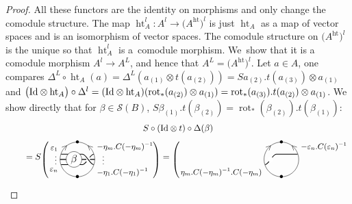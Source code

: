 \documentclass[pdftex]{sigma}%
\numberwithin{equation}{section}
\newcommand{\halft}{{\operatorname{ht}}}
\begin{document}
\begin{proof}
All these functors are the identity on morphisms and only change the comodule structure. The map $\halft_A^l\colon A^l \to \big(A^\halft\big)^l$ is just $\halft_A$ as a map of vector spaces and is an isomorphism of vector spaces. The comodule structure on $\big(A^\halft\big)^l$ is the unique so that $\halft_A^l$ is a~comodule morphism. We~show that it is a comodule morphism $A^l\to A^L$, and hence that $A^L = \big(A^\halft\big)^l$. Let $a \in A$, one compares $\Delta^L \circ \halft_A (a) = \Delta^L(a_{(1)} \otimes t(a_{(2)})) = Sa_{(2)}.t(a_{(3)}) \otimes a_{(1)}$ and $\big({\rm Id} \otimes \halft_A\big) \circ \Delta^l = ({\rm Id} \otimes \halft_A)(\operatorname{rot}_*(a_{(2)})\otimes a_{(1)}) = \operatorname{rot}_*(a_{(3)}).t(a_{(2)}) \otimes a_{(1)}$. We show directly that for $\beta \in \mathscr{S}(B)$, $S\beta_{(1)}.t(\beta_{(2)}) = \operatorname{rot}_*(\beta_{(2)}).t(\beta_{(1)})$:
\begin{gather*}
S \circ ({\rm Id} \otimes t) \circ \Delta (\beta)
\\ \qquad
{}=S\raisebox{-3pt}{$\left(\rule{0pt}{24pt}\right.$}\!\!
\begin{tikzpicture}[scale = 0.7, baseline = 0pt]
\draw (0,-1) node{\small $\bullet$} arc(-90:90:1) node[near end, sloped]{\small $<$} node{\small $\bullet$};
\draw (0,-1) arc(-90:-270:1) node[near end, sloped]{\small $>$};
\draw[thick] (-0.94,-0.3)node[below left]{\small $\varepsilon_n$} -- (0.3,-0.3) .. controls (0.5,-0.3) and (0.74,0.3).. (0.94,0.3)node[above right]{\small $-\eta_m.C(-\eta_m)^{-1}$} node[pos = 0.5, circle, fill = white, scale = 0.66]{};
\draw[thick] (-1,0) node[yshift=2pt, left]{\footnotesize $\vdots$} -- (1,0)node[yshift=2pt,right=5pt]{\footnotesize $\vdots$} node[pos = 0.81, circle, fill = white, scale = 0.46]{};
\draw[thick] (-0.94,0.3) node[above left]{\small $\varepsilon_1$} -- (0.3,0.3) .. controls (0.5,0.3) and (0.74,-0.3).. (0.94,-0.3)node[below right]{\small $-\eta_1.C(-\eta_1)^{-1}$};
\node[circle, fill=white, draw = black, scale = 1.2, inner sep = 1.5pt] (X) at (-0.2,0){$\beta$};
\end{tikzpicture}\!\!\!
\raisebox{-3pt}{$\left.\rule{0pt}{24pt}\right)$}
= \raisebox{-3pt}{$\left(\rule{0pt}{24pt}\right.$}\!\!
\begin{tikzpicture}[scale = 0.7, baseline = 0pt, rotate = 180]
\draw (0,-1) node{\small $\bullet$} arc(-90:90:1) node[near start, sloped]{\small $>$} node{\small $\bullet$};
\draw (0,-1) arc(-90:-270:1) node[near start, sloped]{\small $<$};
\draw[thick] (-0.94,-0.3)node[above right]{\small $-\varepsilon_n.C(\varepsilon_n)^{-1}$} -- (0.3,-0.3) .. controls (0.5,-0.3) and (0.74,0.3).. (0.94,0.3)node[below left]{\small $\eta_m.C(-\eta_m)^{-1}.C(-\eta_m)$} node[pos = 0.5, circle, fill = white, scale = 0.66]{};

\end{tikzpicture}
\end{gather*}
\end{proof}
\end{document}
